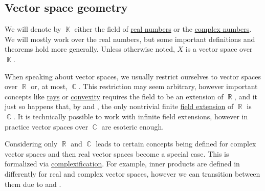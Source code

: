 \subsection{Vector space geometry}\label{subsec:vector_space_geometry}

We will denote by \( \BbbK \) either the field of \hyperref[def:real_numbers]{real numbers} or the \hyperref[def:real_numbers]{complex numbers}. We will mostly work over the real numbers, but some important definitions and theorems hold more generally. Unless otherwise noted, \( X \) is a vector space over \( \BbbK \).

\begin{remark}\label{rem:real_field_extensions}
  When speaking about vector spaces, we usually restrict ourselves to vector spaces over \( \BbbR \) or, at most, \( \BbbC \). This restriction may seem arbitrary, however important concepts like \hyperref[def:geometric_ray]{rays} or \hyperref[def:convex_hull]{convexity} requires the field to be an extension of \( \BbbR \), and it just so happens that, by  and , the only nontrivial finite \hyperref[def:field/submodel]{field extension} of \( \BbbR \) is \( \BbbC \). It is technically possible to work with infinite field extensions, however in practice vector spaces over \( \BbbC \) are esoteric enough.

  Considering only \( \BbbR \) and \( \BbbC \) leads to certain concepts being defined for complex vector spaces and then real vector spaces become a special case. This is formalized via \hyperref[def:complexification]{complexification}. For example, inner products are defined in  differently for real and complex vector spaces, however we can transition between them due to  and .
\end{remark}

